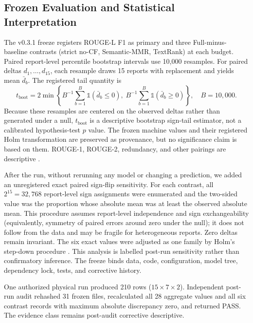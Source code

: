 \documentclass[applsci,article,submit,moreauthors]{Definitions/mdpi}
\begin{document}
\subsection{Frozen Evaluation and Statistical Interpretation}

The v0.3.1 freeze registers ROUGE-L F1 as primary and three Full-minus-baseline contrasts (strict no-CF, Semantic-MMR, TextRank) at each budget. Paired report-level percentile bootstrap intervals use 10,000 resamples. For paired deltas $d_1,\ldots,d_{15}$, each resample draws 15 reports with replacement and yields mean $\bar d_b$. The registered tail quantity is
\begin{equation}
t_{\mathrm{boot}}=2\min\left\{B^{-1}\sum_{b=1}^{B}\mathbb{1}(\bar d_b\leq0),\;B^{-1}\sum_{b=1}^{B}\mathbb{1}(\bar d_b\geq0)\right\},\quad B=10{,}000.
\end{equation}
Because these resamples are centered on the observed deltas rather than generated under a null, $t_{\mathrm{boot}}$ is a descriptive bootstrap sign-tail estimator, not a calibrated hypothesis-test $p$ value. The frozen machine values and their registered Holm transformation are preserved as provenance, but no significance claim is based on them. ROUGE-1, ROUGE-2, redundancy, and other pairings are descriptive \cite{cameron2008bootstrap}.

After the run, without rerunning any model or changing a prediction, we added an unregistered exact paired sign-flip sensitivity. For each contrast, all $2^{15}=32{,}768$ report-level sign assignments were enumerated and the two-sided value was the proportion whose absolute mean was at least the observed absolute mean. This procedure assumes report-level independence and sign exchangeability (equivalently, symmetry of paired errors around zero under the null); it does not follow from the data and may be fragile for heterogeneous reports. Zero deltas remain invariant. The six exact values were adjusted as one family by Holm's step-down procedure \cite{holm1979simple}. This analysis is labelled post-run sensitivity rather than confirmatory inference. The freeze binds data, code, configuration, model tree, dependency lock, tests, and corrective history.

One authorized physical run produced 210 rows ($15\times7\times2$). Independent post-run audit rehashed 31 frozen files, recalculated all 28 aggregate values and all six contrast records with maximum absolute discrepancy zero, and returned PASS. The evidence class remains post-audit corrective descriptive.
\end{document}
